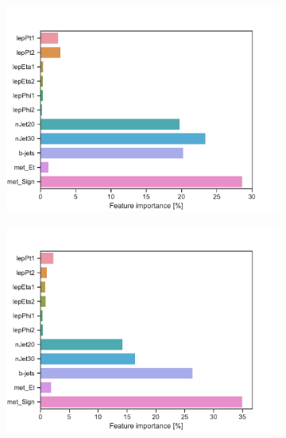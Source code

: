 \begin{figure}[H]
\begin{subfigure}[t!]{0.49\textwidth}
        \caption{}
        \label{fig:featSlepsnuLow}
    \end{subfigure}
    \begin{subfigure}[t!]{0.49\textwidth}
        \includegraphics[width = \textwidth]{Figures/WW/BDT/Low_level/Inter/featureImportance.pdf}
        \caption{}
        \label{fig:featWWLow}
    \end{subfigure}
    \begin{subfigure}[t!]{0.49\textwidth}
        \includegraphics[width = \textwidth]{Figures/Mono_Z/ML/BDT/Low_level/Inter/featureImportance.pdf}
        \caption{}
        \label{fig:featMonoZLow}
    \end{subfigure}
    \caption{}
    \label{fig:resExample}
\end{figure}

